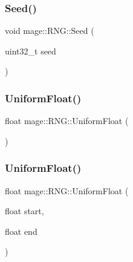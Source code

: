 \hypertarget{classmage_1_1_r_n_g_a3153153ce32679f0431a3b5554a899a4}{}\label{classmage_1_1_r_n_g_a3153153ce32679f0431a3b5554a899a4} 
\subsubsection{\texorpdfstring{Seed()}{Seed()}}
{\footnotesize\ttfamily void mage\+::\+R\+N\+G\+::\+Seed (\begin{DoxyParamCaption}\item[{uint32\+\_\+t}]{seed }\end{DoxyParamCaption})\hspace{0.3cm}{\ttfamily [noexcept]}}

\hypertarget{classmage_1_1_r_n_g_af6021a6a30b1d45ad8fd46fa57f86074}{}\label{classmage_1_1_r_n_g_af6021a6a30b1d45ad8fd46fa57f86074} 
\subsubsection{\texorpdfstring{Uniform\+Float()}{UniformFloat()}\hspace{0.1cm}{\footnotesize\ttfamily [1/2]}}
{\footnotesize\ttfamily float mage\+::\+R\+N\+G\+::\+Uniform\+Float (\begin{DoxyParamCaption}{ }\end{DoxyParamCaption})\hspace{0.3cm}{\ttfamily [noexcept]}}

\hypertarget{classmage_1_1_r_n_g_a2b8c3ad557d6f6e0660c18defdc67f61}{}\label{classmage_1_1_r_n_g_a2b8c3ad557d6f6e0660c18defdc67f61} 
\subsubsection{\texorpdfstring{Uniform\+Float()}{UniformFloat()}\hspace{0.1cm}{\footnotesize\ttfamily [2/2]}}
{\footnotesize\ttfamily float mage\+::\+R\+N\+G\+::\+Uniform\+Float (\begin{DoxyParamCaption}\item[{float}]{start,  }\item[{float}]{end }\end{DoxyParamCaption})\hspace{0.3cm}{\ttfamily [noexcept]}}



